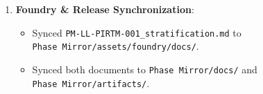 \documentclass[
]{article}
\providecommand{\tightlist}{%
  \setlength{\itemsep}{0pt}\setlength{\parskip}{0pt}}
\begin{document}
\begin{enumerate}
\begin{itemize}
    \begin{itemize}
    \tightlist
    \item
      \texttt{phase-mirror-agent}: 88 passed
    \item
      \texttt{phase-mirror-gpt}: 8 passed
    \item
      \texttt{phase-mirror-mcp}: 17 passed
    \item
      \texttt{phase-mirror-surface}: 3 passed
    \item
      \texttt{verification-harness}: 4 passed
    \item
      \texttt{lexlean-stratum}: 67 passed
    \end{itemize}
  \end{itemize}
\item
  \textbf{Foundry \& Release Synchronization}:

  \begin{itemize}
  \tightlist
  \item
    Synced \texttt{PM-LL-PIRTM-001\_stratification.md} to
    \texttt{Phase\ Mirror/assets/foundry/docs/}.
  \item
    Synced both documents to \texttt{Phase\ Mirror/docs/} and
    \texttt{Phase\ Mirror/artifacts/}.
  \end{itemize}
\end{enumerate}
\end{document}
